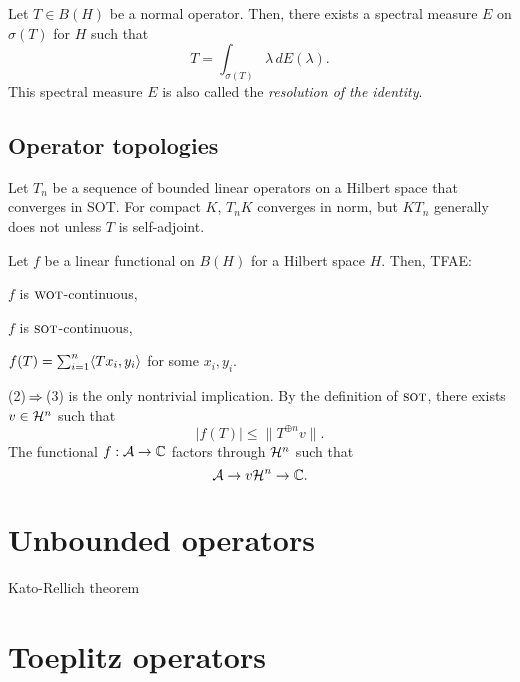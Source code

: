 \documentclass{../../large}
\newcommand{\wot}{{\text{\sc wot}}}
\newcommand{\sot}{{\text{\sc sot}}}
\begin{document}
\begin{prb}
Let $T\in B(H)$ be a normal operator.
Then, there exists a spectral measure $E$ on $\sigma(T)$ for $H$ such that
\[T=\int_{\sigma(T)}\lambda\,dE(\lambda).\]
This spectral measure $E$ is also called the \emph{resolution of the identity}.
\end{prb}



\section{Operator topologies}


\begin{prb}
Let $T_n$ be a sequence of bounded linear operators on a Hilbert space that converges in SOT.
For compact $K$, $T_n K$ converges in norm, but $KT_n$ generally does not unless $T$ is self-adjoint.
\end{prb}

\begin{prb}
Let $f$ be a linear functional on $B(H)$ for a Hilbert space $H$.
Then, TFAE:
\begin{parts}
\item $f$ is $\wot$-continuous,
\item $f$ is $\sot$-continuous,
\item $f(T)=\sum_{i=1}^n\langle Tx_i,y_i\rangle$ for some $x_i,y_i$.
\end{parts}
\end{prb}
\begin{pf}
(2)$\impl$(3) is the only nontrivial implication.
By the definition of $\sot$, there exists $v\in \mathcal{H}^n$ such that
\[|f(T)|\le\|T^{\oplus n}v\|.\]
The functional $f:\mathcal{A}\to\mathbb{C}$ factors through $\mathcal{H}^n$ such that
\[\mathcal{A}\to{v}\mathcal{H}^n\to\mathbb{C}.\]
\end{pf}






\chapter{Unbounded operators}



Kato-Rellich theorem




\chapter{Toeplitz operators}
\end{document}
